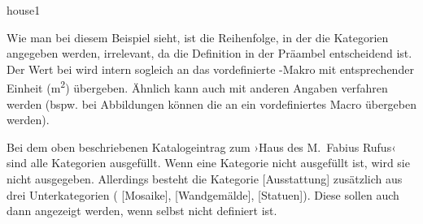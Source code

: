 \begin{lfgwprint}{house1}
\end{lfgwprint}
Wie man bei diesem Beispiel sieht, ist die Reihenfolge, in der die Kategorien
 angegeben werden, irrelevant, da die Definition in der Präambel entscheidend ist.
Der Wert bei  wird intern sogleich an das vordefinierte -Makro mit entsprechender Einheit (\si{\meter\squared}) übergeben.
Ähnlich kann auch mit anderen Angaben verfahren werden (bspw. bei Abbildungen können die  an ein vordefiniertes Macro  übergeben werden).

Bei dem oben beschriebenen Katalogeintrag zum 
›Haus des M.~Fabius Rufus‹ sind alle Kategorien ausgefüllt. 
Wenn eine Kategorie nicht ausgefüllt ist, wird sie nicht ausgegeben.
Allerdings besteht die Kategorie  [Ausstattung]  zusätzlich aus drei Unterkategorien 
( [Mosaike],  [Wandgemälde],  [Statuen]).
Diese sollen auch dann angezeigt werden, wenn  selbst nicht definiert ist.

